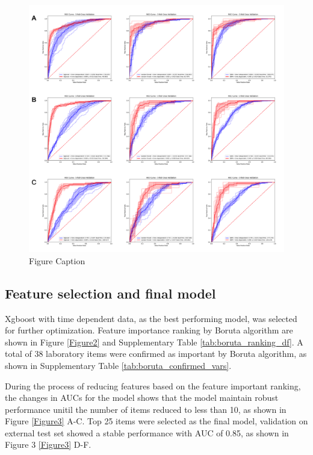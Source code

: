 \documentclass[final,1p,times,authoryear]{elsarticle}
\begin{document}
\begin{figure}[t]%
    \centering%
    \includegraphics[width=\textwidth]{figures/kfoldfirst3.png}
    \caption{Figure Caption}\label{Figure1}
\end{figure}


\subsection{Feature selection and final model}\label{FinalModel}

Xgboost with time dependent data, as the best performing model, was selected for further optimization. Feature importance ranking by Boruta algorithm are shown in Figure \ref{Figure2} and Supplementary Table \ref{tab:boruta_ranking_df}. A total of 38 laboratory items were confirmed as important by Boruta algorithm, as shown in Supplementary Table \ref{tab:boruta_confirmed_vars}.

During the process of reducing features based on the feature important ranking, the changes in AUCs for the model shows that the model maintain robust performance unitil the number of items reduced to less than 10, as shown in Figure \ref{Figure3} A-C. Top 25 items were selected as the final model, validation on external test set showed a stable performance with AUC of 0.85, as shown in Figure 3 \ref{Figure3} D-F.
\end{document}
